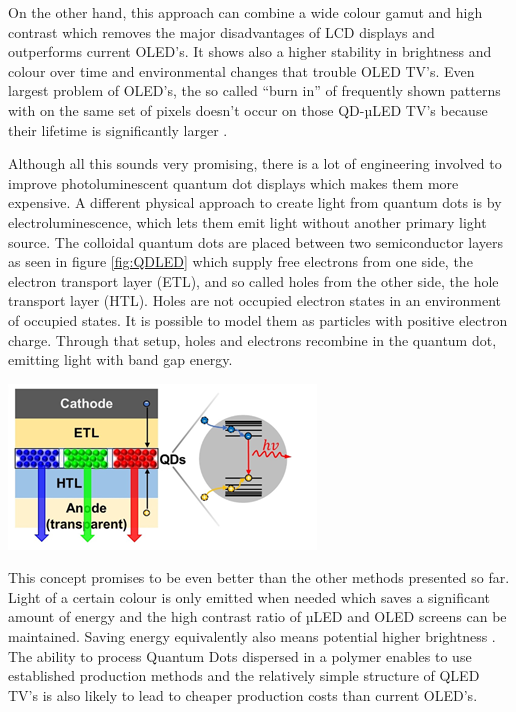 \documentclass[11pt,a4paper]{article} %
\begin{document}
\begin{multicols}{2}

    On the other hand, this approach can combine a wide colour gamut and high
    contrast which removes the major disadvantages of LCD displays and outperforms
    current OLED’s. It shows also a higher stability in brightness and colour over
    time and environmental changes that trouble OLED TV’s. Even largest problem of
    OLED’s, the so called “burn in” of frequently shown patterns with on the same
    set of pixels doesn’t occur on those QD-µLED TV’s because their lifetime is
    significantly larger \cite{Liu2020}.

    Although all this sounds very promising, there is a lot of engineering
    involved to improve photoluminescent quantum dot displays which makes them more
    expensive. A different physical approach to create light from quantum dots is
    by electroluminescence, which lets them emit light without another primary
    light source. The colloidal quantum dots are placed between two semiconductor
    layers as seen in figure \ref{fig:QDLED} which supply free electrons from one side, the
    electron transport layer (ETL), and so called holes from the other side, the
    hole transport layer (HTL). Holes are not occupied electron states in an
    environment of occupied states. It is possible to model them as particles with
    positive electron charge. Through that setup, holes and electrons recombine in
    the quantum dot, emitting light with band gap energy.

    \begin{Figure}
        \centering
        \includegraphics[width=0.9\linewidth]{ellumLED.png}
        \label{fig:QDLED}
    \end{Figure}

    This concept promises to be even better than the other methods presented so
    far. Light of a certain colour is only emitted when needed which saves a
    significant amount of energy and the high contrast ratio of µLED and OLED
    screens can be maintained. Saving energy equivalently also means potential
    higher brightness \cite{ctarticle}. The ability to process Quantum Dots dispersed
    in a polymer enables to use established production methods and
    the relatively simple structure of QLED TV’s is also likely to lead to cheaper
    production costs than current OLED’s.


\end{multicols}
\end{document}

